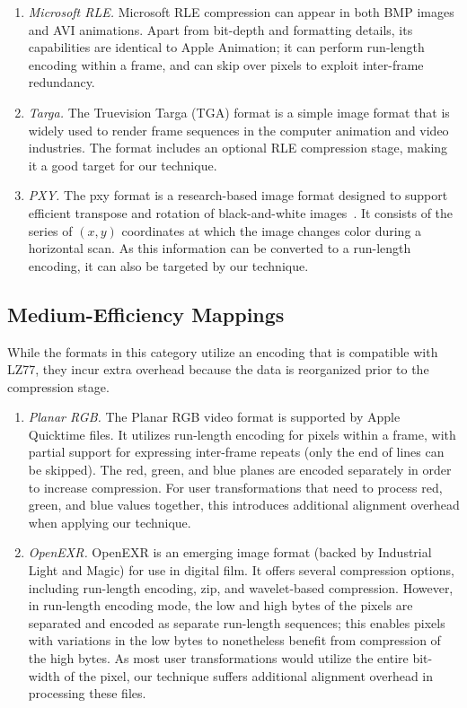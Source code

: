 \begin{enumerate}
\item {\it Microsoft RLE.}  Microsoft RLE compression can appear in
  both BMP images and AVI animations.  Apart from bit-depth and
  formatting details, its capabilities are identical to Apple
  Animation; it can perform run-length encoding within a frame, and
  can skip over pixels to exploit inter-frame redundancy.

\item {\it Targa.} The Truevision Targa (TGA) format is a simple image
  format that is widely used to render frame sequences in the computer
  animation and video industries.  The format includes an optional RLE
  compression stage, making it a good target for our technique.

\item {\it PXY.} The pxy format is a research-based image format
  designed to support efficient transpose and rotation of
  black-and-white images~\cite{shoji95}.  It consists of the series of
  $(x,y)$ coordinates at which the image changes color during a
  horizontal scan.  As this information can be converted to a
  run-length encoding, it can also be targeted by our technique.

\end{enumerate}

\subsection*{Medium-Efficiency Mappings}
\label{sec:formats-med}

While the formats in this category utilize an encoding that is
compatible with LZ77, they incur extra overhead because the data is
reorganized prior to the compression stage.

\begin{enumerate}

\item {\it Planar RGB.} The Planar RGB video format is supported by
  Apple Quicktime files.  It utilizes run-length encoding for pixels
  within a frame, with partial support for expressing inter-frame
  repeats (only the end of lines can be skipped).  The red, green, and
  blue planes are encoded separately in order to increase compression.
  For user transformations that need to process red, green, and blue
  values together, this introduces additional alignment overhead when
  applying our technique.

\item {\it OpenEXR.} OpenEXR is an emerging image format (backed by
  Industrial Light and Magic) for use in digital film.  It offers
  several compression options, including run-length encoding, zip, and
  wavelet-based compression.  However, in run-length encoding mode,
  the low and high bytes of the pixels are separated and encoded as
  separate run-length sequences; this enables pixels with variations
  in the low bytes to nonetheless benefit from compression of the high
  bytes.  As most user transformations would utilize the entire
  bit-width of the pixel, our technique suffers additional alignment
  overhead in processing these files.

\end{enumerate}

